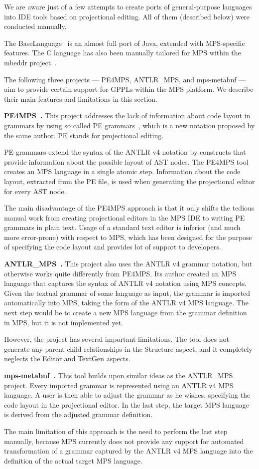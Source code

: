 We are aware just of a few attempts to create ports of general-purpose languages into IDE tools based on projectional editing.
All of them (described below) were conducted manually.

The BaseLanguage~\cite{ref:BASELANG} is an almost full port of Java, extended with MPS-specific features.
The C language has also been manually tailored for MPS within the mbeddr project~\cite{ref:MBEDDR}.

The following three projects --- PE4MPS, ANTLR{\_}MPS, and mps-metabnf --- aim to provide certain support for GPPLs within the MPS platform.
We describe their main features and limitations in this section.

\noindent\textbf{PE4MPS~\cite{ref:PE4MPS}.}
This project addresses the lack of information about code layout in grammars by using so called PE grammars~\cite{ref:PE}, which is a new notation proposed by the same author.
PE stands for projectional editing.

PE grammars extend the syntax of the ANTLR v4 notation by constructs that provide information about the possible layout of AST nodes.
The PE4MPS tool creates an MPS language in a single atomic step.
Information about the code layout, extracted from the PE file, is used when generating the projectional editor for every AST node.

The main disadvantage of the PE4MPS approach is that it only shifts the tedious manual work from creating projectional editors in the MPS IDE to writing PE grammars in plain text.
Usage of a standard text editor is inferior (and much more error-prone) with respect to MPS, which has been designed for the purpose of specifying the code layout and provides lot of support to developers.

\noindent\textbf{ANTLR{\_}MPS~\cite{ref:ANTLR2MPS}.}
This project also uses the ANTLR v4 grammar notation, but otherwise works quite differently from PE4MPS.
Its author created an MPS language that captures the syntax of ANTLR v4 notation using MPS concepts.
Given the textual grammar of some language as input, the grammar is imported automatically into MPS, taking the form of the ANTLR v4 MPS language.
The next step would be to create a new MPS language from the grammar definition in MPS, but it is not implemented yet.

However, the project has several important limitations.
The tool does not generate any parent-child relationships in the Structure aspect, and it completely neglects the Editor and TextGen aspects.

\noindent\textbf{mps-metabnf~\cite{ref:MPSMETABNF}.}
This tool builds upon similar ideas as the ANTLR{\_}MPS project.
Every imported grammar is represented using an ANTLR v4 MPS language.
A user is then able to adjust the grammar as he wishes, specifying the code layout in the projectional editor.
In the last step, the target MPS language is derived from the adjusted grammar definition.

The main limitation of this approach is the need to perform the last step manually, because MPS currently does not provide any support for automated transformation of a grammar captured by the ANTLR v4 MPS language into the definition of the actual target MPS language.

